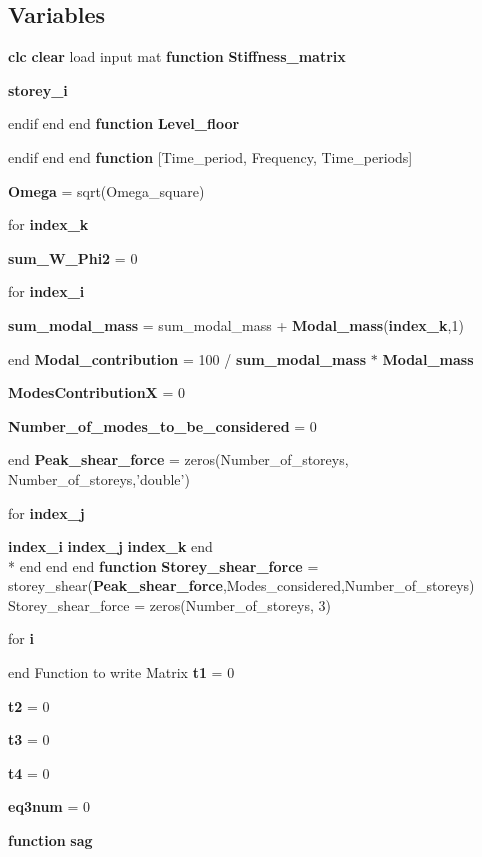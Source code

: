 \subsection*{Variables}
\begin{DoxyCompactItemize}
\item 
{\bf clc} {\bf clear} load input mat {\bf function} {\bf Stiffness\-\_\-matrix}
\item 
{\bf storey\-\_\-i}
\item 
endif end end {\bf function} {\bf Level\-\_\-floor}
\item 
endif end end {\bf function} [Time\-\_\-period, Frequency, Time\-\_\-periods]
\item 
{\bf Omega} = sqrt(Omega\-\_\-square)
\item 
for {\bf index\-\_\-k}
\item 
{\bf sum\-\_\-\-W\-\_\-\-Phi2} = 0
\item 
for {\bf index\-\_\-i}
\item 
{\bf sum\-\_\-modal\-\_\-mass} = sum\-\_\-modal\-\_\-mass + {\bf Modal\-\_\-mass}({\bf index\-\_\-k},1)
\item 
end {\bf Modal\-\_\-contribution} = 100 / {\bf sum\-\_\-modal\-\_\-mass} $\ast$ {\bf Modal\-\_\-mass}
\item 
{\bf Modes\-Contribution\-X} = 0
\item 
{\bf Number\-\_\-of\-\_\-modes\-\_\-to\-\_\-be\-\_\-considered} = 0
\item 
end {\bf Peak\-\_\-shear\-\_\-force} = zeros(Number\-\_\-of\-\_\-storeys, Number\-\_\-of\-\_\-storeys,'double')
\item 
for {\bf index\-\_\-j}
\item 
{\bf index\-\_\-i} {\bf index\-\_\-j} {\bf index\-\_\-k} end \\*
end end end {\bf function} {\bf Storey\-\_\-shear\-\_\-force} = storey\-\_\-shear({\bf Peak\-\_\-shear\-\_\-force},Modes\-\_\-considered,Number\-\_\-of\-\_\-storeys) Storey\-\_\-shear\-\_\-force = zeros(Number\-\_\-of\-\_\-storeys, 3)
\item 
for {\bf i}
\item 
end Function to write Matrix {\bf t1} = 0
\item 
{\bf t2} = 0
\item 
{\bf t3} = 0
\item 
{\bf t4} = 0
\item 
{\bf eq3num} = 0
\item 
{\bf function} {\bf sag}
\end{DoxyCompactItemize}



